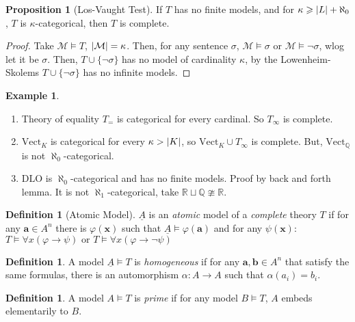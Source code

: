 \documentclass[a4paper,10pt]{article}
\theoremstyle{definition}
\DeclarePairedDelimiter\abs{\lvert}{\rvert}
\newtheorem{definition}[theorem]{Definition}
\newtheorem{example}[theorem]{Example}
\newtheorem{proposition}[theorem]{Proposition}
\let\vec\mathbf
\let\phi\varphi
\begin{document}
\begin{proposition}[Los-Vaught Test]
    If $T$ has no finite models, and for $\kappa \geqslant \abs{L} + \aleph_0$, $T$ is $\kappa$-categorical, then $T$ is complete.
\end{proposition}

\begin{proof}
    Take $\mathcal{M} \models T$, $\abs{\mathcal{M}} = \kappa$. Then, for any sentence $\sigma$, $\mathcal{M} \models \sigma$ or $\mathcal{M} \models \neg \sigma$, wlog let it be $\sigma$. Then, $T \cup \{\neg \sigma\}$ has no model of cardinality $\kappa$, by the Lowenheim-Skolems $T \cup \{\neg \sigma\}$ has no infinite models.
\end{proof}


\begin{example}
    \begin{enumerate}
        \item Theory of equality $T_=$ is categorical for every cardinal. So $T_{\infty}$ is complete.
        \item $\mathrm{Vect}_K$ is categorical for every $\kappa > \abs{K}$, so $\mathrm{Vect}_K \cup T_\infty$ is complete. But, $\mathrm{Vect}_\mathbb{Q}$ is not $\aleph_0$-categorical.
        \item $\mathrm{DLO}$ is $\aleph_0$-categorical and has no finite models. Proof by back and forth lemma. It is not $\aleph_1$-categorical, take $\mathbb{R} \sqcup \mathbb{Q} \ncong \mathbb{R}$.
    \end{enumerate}
\end{example}

\begin{definition}[Atomic Model]
    $\underline{A}$ is an \emph{atomic} model of a \emph{complete} theory $T$ if for any $\vec{a} \in A^n$ there is $\phi(\vec{x})$ such that $\underline{A} \models \phi(\vec{a})$ and for any $\psi(\vec{x})$:
$        T \vDash \forall x (\phi \rightarrow \psi) \text{ or } T \vDash \forall x (\phi \rightarrow \neg \psi)$
\end{definition}

\begin{definition}
    A model $\underline{A} \models T$ is \emph{homogeneous} if for any $\vec{a}, \vec{b} \in A^n$ that satisfy the same formulas, there is an automorphism $\alpha \colon A \longrightarrow A$ such that $\alpha(a_i) = b_i$.
\end{definition}

\begin{definition}
    A model $A \models T$ is \emph{prime} if for any model $B \models T$, $A$ embeds elementarily to $B$.
\end{definition}
\end{document}
